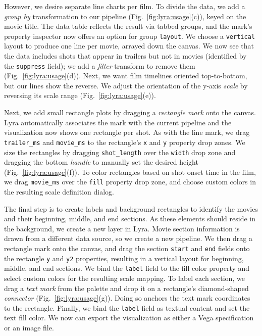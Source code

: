 However, we desire separate line charts per film. To divide the data, we add a
\emph{group by} transformation to our pipeline (Fig.~\ref{fig:lyra:usage}(c)),
keyed on the movie title. The data table reflects the result via tabbed groups,
and the mark's property inspector now offers an option for group
\texttt{layout}. We choose a \texttt{vertical} layout to produce one line per
movie, arrayed down the canvas. We now see that the data includes shots that
appear in trailers but not in movies (identified by the \texttt{suppress}
field); we add a \emph{filter} transform to remove them
(Fig.~\ref{fig:lyra:usage}(d)). Next, we want film timelines oriented
top-to-bottom, but our lines show the reverse. We adjust the orientation of the
y-axis \emph{scale} by reversing its scale range (Fig.~\ref{fig:lyra:usage}(e)).

Next, we add small rectangle plots by dragging a \emph{rectangle mark} onto the
canvas. Lyra automatically associates the mark with the current pipeline and the
visualization now shows one rectangle per shot. As with the line mark, we drag
\texttt{trailer\_ms} and \texttt{movie\_ms} to the rectangle's \texttt{x} and
\texttt{y} property drop zones. We size the rectangles by dragging
\texttt{shot\_length} over the \texttt{width} drop zone and dragging the bottom
\emph{handle} to manually set the desired height (Fig.~\ref{fig:lyra:usage}(f)).
To color rectangles based on shot onset time in the film, we drag
\texttt{movie\_ms} over the \texttt{fill} property drop zone, and choose custom
colors in the resulting scale definition dialog.

The final step is to create labels and background rectangles to identify the
movies and their beginning, middle, and end sections. As these elements should
reside in the background, we create a new layer in Lyra. Movie section
information is drawn from a different data source, so we create a new pipeline.
We then drag a rectangle mark onto the canvas, and drag the section
\texttt{start} and \texttt{end} fields onto the rectangle \texttt{y} and
\texttt{y2} properties, resulting in a vertical layout for beginning, middle,
and end sections. We bind the \texttt{label} field to the fill color property
and select custom colors for the resulting scale mapping. To label each section,
we drag a \emph{text mark} from the palette and drop it on a rectangle's
diamond-shaped \emph{connector} (Fig.~\ref{fig:lyra:usage}(g)). Doing so anchors
the text mark coordinates to the rectangle. Finally, we bind the \texttt{label}
field as textual content and set the text fill color. We now can export the
visualization as either a Vega specification or an image file.